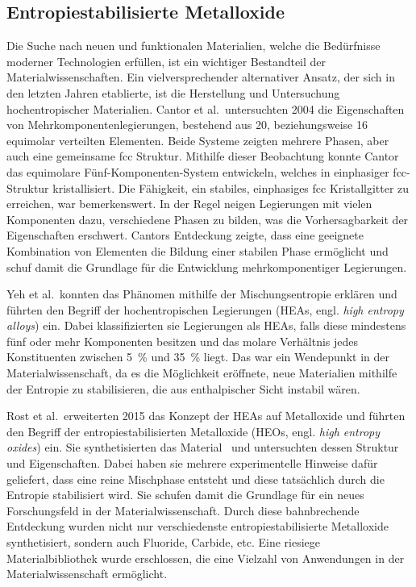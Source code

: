 \subsection{Entropiestabilisierte Metalloxide}\label{subsec:hochentropische-metalloxide}
Die Suche nach neuen und funktionalen Materialien, welche die Bedürfnisse moderner Technologien erfüllen, ist ein
wichtiger Bestandteil der Materialwissenschaften.
Ein vielversprechender alternativer Ansatz, der sich in den letzten Jahren etablierte, ist die Herstellung und
Untersuchung hochentropischer Materialien.
Cantor et al.\ untersuchten 2004 die Eigenschaften von Mehrkomponentenlegierungen, bestehend aus 20,
beziehungsweise 16 equimolar verteilten Elementen.
Beide Systeme zeigten mehrere Phasen, aber auch eine gemeinsame fcc Struktur.
Mithilfe dieser Beobachtung konnte Cantor das equimolare Fünf-Komponenten-System  entwickeln, welches in
einphasiger fcc-Struktur kristallisiert.\autocite{cantor}
Die Fähigkeit, ein stabiles, einphasiges fcc Kristallgitter zu erreichen, war bemerkenswert.
In der Regel neigen Legierungen mit vielen Komponenten dazu, verschiedene Phasen zu bilden, was die
Vorhersagbarkeit der Eigenschaften erschwert.
Cantors Entdeckung zeigte, dass eine geeignete Kombination von Elementen die Bildung einer stabilen Phase ermöglicht
und schuf damit die Grundlage für die Entwicklung mehrkomponentiger Legierungen.

Yeh et al.\ konnten das Phänomen mithilfe der Mischungsentropie erklären und führten den Begriff der
hochentropischen Legierungen (HEAs, engl. \textit{high entropy alloys}) ein.
Dabei klassifizierten sie Legierungen als HEAs, falls diese mindestens fünf oder mehr Komponenten besitzen
und das molare Verhältnis jedes Konstituenten zwischen \qty{5}{\percent} und \qty{35}{\percent} liegt.\autocite{yeh}
Das war ein Wendepunkt in der Materialwissenschaft, da es die Möglichkeit eröffnete, neue Materialien mithilfe
der Entropie zu stabilisieren, die aus enthalpischer Sicht instabil wären.


Rost et al.\ erweiterten 2015 das Konzept der HEAs auf Metalloxide und führten den Begriff der entropiestabilisierten
Metalloxide (HEOs, engl. \textit{high entropy oxides}) ein.
Sie synthetisierten das Material \heo\ und untersuchten dessen Struktur und Eigenschaften.
Dabei haben sie mehrere experimentelle Hinweise dafür geliefert, dass eine reine Mischphase entsteht und diese tatsächlich
durch die Entropie stabilisiert wird.
Sie schufen damit die Grundlage für ein neues Forschungsfeld in der Materialwissenschaft.\autocite{Rost2015}
Durch diese bahnbrechende Entdeckung wurden nicht nur verschiedenste entropiestabilisierte Metalloxide synthetisiert,
sondern auch Fluoride, Carbide, etc.
Eine riesiege Materialbibliothek wurde erschlossen, die eine Vielzahl von Anwendungen in der Materialwissenschaft
ermöglicht.

